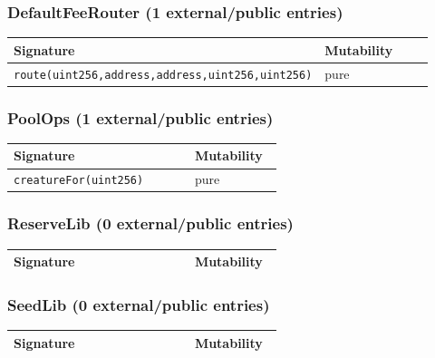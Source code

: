 \subsubsection*{DefaultFeeRouter \;\normalfont\small(1 external/public entries)}
\begin{longtable}{@{}p{0.62\linewidth}p{0.30\linewidth}@{}}
\toprule \textbf{Signature} & \textbf{Mutability} \\ \midrule \endhead
\texttt{\scriptsize route(uint256,address,address,uint256,uint256)} & pure \\
\bottomrule\end{longtable}

\subsubsection*{PoolOps \;\normalfont\small(1 external/public entries)}
\begin{longtable}{@{}p{0.62\linewidth}p{0.30\linewidth}@{}}
\toprule \textbf{Signature} & \textbf{Mutability} \\ \midrule \endhead
\texttt{\scriptsize creatureFor(uint256)} & pure \\
\bottomrule\end{longtable}

\subsubsection*{ReserveLib \;\normalfont\small(0 external/public entries)}
\begin{longtable}{@{}p{0.62\linewidth}p{0.30\linewidth}@{}}
\toprule \textbf{Signature} & \textbf{Mutability} \\ \midrule \endhead
\bottomrule\end{longtable}

\subsubsection*{SeedLib \;\normalfont\small(0 external/public entries)}
\begin{longtable}{@{}p{0.62\linewidth}p{0.30\linewidth}@{}}
\toprule \textbf{Signature} & \textbf{Mutability} \\ \midrule \endhead
\bottomrule\end{longtable}

